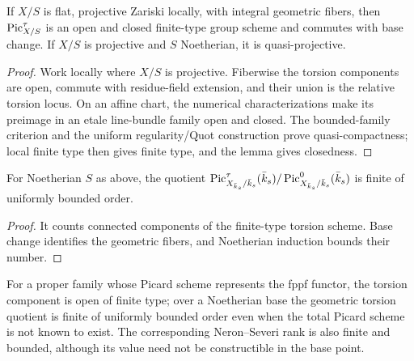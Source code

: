 \begin{theorem}\label{kps-thm-pict-finite}
If $X/S$ is flat, projective Zariski locally, with integral geometric fibers,
then $\operatorname{Pic}^\tau_{X/S}$ is an open and closed finite-type group scheme and commutes
with base change. If $X/S$ is projective and $S$ Noetherian, it is
quasi-projective.
\end{theorem}
\begin{proof}
Work locally where $X/S$ is projective. Fiberwise the torsion components are
open, commute with residue-field extension, and their union is the relative
torsion locus. On an affine chart, the numerical characterizations make its
preimage in an etale line-bundle family open and closed. The bounded-family
criterion and the uniform regularity/Quot construction prove quasi-compactness;
local finite type then gives finite type, and the lemma gives closedness.
\end{proof}

\begin{corollary}\label{kps-cor-component-group}
For Noetherian $S$ as above, the quotient
$\operatorname{Pic}^\tau_{X_{\bar k_s}/\bar k_s}(\bar k_s)/\operatorname{Pic}^0_{X_{\bar k_s}/\bar k_s}(\bar k_s)$ is
finite of uniformly bounded order.
\end{corollary}
\begin{proof}
It counts connected components of the finite-type torsion scheme. Base change
identifies the geometric fibers, and Noetherian induction bounds their number.
\end{proof}

\begin{remark}\label{kps-rmk-pict-finite-general}
For a proper family whose Picard scheme represents the fppf functor, the
torsion component is open of finite type; over a Noetherian base the geometric
torsion quotient is finite of uniformly bounded order even when the total
Picard scheme is not known to exist. The corresponding Neron--Severi rank is
also finite and bounded, although its value need not be constructible in the
base point.
\end{remark}

